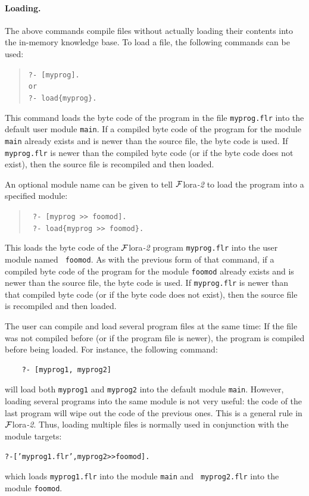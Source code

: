 \documentclass[11pt]{article}
\newcommand{\FLSYSTEM}{{\mbox{\sc ${\cal F}${lora}\rm\emph{-2}}}\xspace}
\newcommand{\flrext}{flr}
\begin{document}
\paragraph{Loading.}
%
The above commands compile files without actually loading their contents
into the in-memory knowledge base. 
To load a file, the following commands can be used:
\index{\tt [file]}
\begin{quote}
 \tt ?- [myprog].  
 \\
 or
 \\
 \tt ?- load\{myprog\}.
\end{quote}
This command loads the byte code of the program in the file {\tt myprog.\flrext} into the default user
module {\tt main}. If a compiled byte code of the program for the module
{\tt main} already exists and is newer than the source file, the byte code
is used.  If {\tt myprog.\flrext} is newer than the compiled byte code (or if
the byte code does not exist), then
the source file is recompiled and then loaded.

An optional module name can be given to tell \FLSYSTEM to
load the program into a specified module:
\begin{quote}
  \tt
    ?- [myprog >{}> foomod].\\
    \tt
    ?- load\{myprog >{}> foomod\}.
\end{quote}
This loads the byte code of the \FLSYSTEM program {\tt myprog.\flrext} into the user module named {\tt
  foomod}. As with the previous form of that command, if a compiled byte code of the program for the module
{\tt foomod} already exists and is newer than the source file, the byte code
is used.  If {\tt myprog.\flrext} is newer than that compiled byte code (or if
the byte code does not exist), then
the source file is recompiled and then loaded.

The user can compile and load several program
files at the same time: If the file was not compiled before (or if the
program file is newer), the program is compiled before being loaded.
For instance, the following command:
\begin{verbatim}
    ?- [myprog1, myprog2]
\end{verbatim}
will load both {\tt myprog1} and {\tt myprog2} into the default module
{\tt main}. However, loading several programs into the same module is not
very useful: the code of the last program will wipe out the code of the
previous ones. This is a general rule in \FLSYSTEM. Thus, loading
multiple files is normally used in conjunction with the module targets:
\begin{alltt}
    ?- ['myprog1.\flrext', myprog2 >{}> foomod].
\end{alltt}
which loads {\tt myprog1.\flrext} into the module {\tt main} and {\tt
  myprog2.\flrext} into the module {\tt foomod}.
\end{document}

